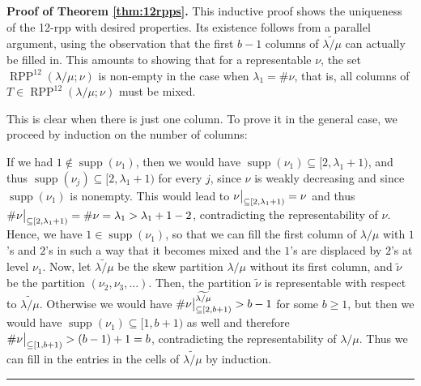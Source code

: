 \documentclass[12pt]{article}
\theoremstyle{plain}
\theoremstyle{definition}
\newenvironment{proof}[1][Proof]{\noindent\textbf{#1.} }{\ \rule{0.5em}{0.5em}}
\def\seplistvar{{{\nu}}} %
\def\supp{{\operatorname{supp}}}
\def\lm{{\lambda/\mu}}
\def\OneTwoRPPCutvar{{\operatorname{RPP}^{12}\left(  \lambda/\mu ;\seplistvar \right)}}
\begin{document}
\begin{proof}[Proof of Theorem \ref{thm:12rpps}]
This inductive proof shows the uniqueness of the 12-rpp with desired properties. Its existence follows from a parallel argument, using the observation that the first $b-1$ columns of $\widetilde{\lm}$ can actually be filled in. This amounts to showing that for a representable $\seplistvar$, the set $\OneTwoRPPCutvar$ is non-empty in the case when $\lambda_1 = \#\seplistvar$, that is, all columns of $T \in \OneTwoRPPCutvar$ must be mixed.

This is clear when there is just one column. To prove it in the general case, we proceed by induction on the number of columns:

If we had $1 \notin \supp(\seplistvar_1)$, then we would have $\supp(\seplistvar_1) \subseteq [2, \lambda_1+1)$, and thus $\supp(\seplistvar_j) \subseteq [2, \lambda_1+1)$ for every $j$, since $\seplistvar$ is weakly decreasing and since $\supp(\seplistvar_1)$ is nonempty. This would lead to $\nuxy{2}{\lambda_1+1} = \seplistvar$ and thus $\#\nuxy{2}{\lambda_1+1} = \#\seplistvar = \lambda_1 > \lambda_1 + 1 - 2$, contradicting the representability of $\seplistvar$. Hence, we have $1 \in \supp(\seplistvar_1)$, so that we can fill the first column of $\lm$ with $1$'s and $2$'s in such a way that it becomes mixed and the $1$'s are displaced by $2$'s at level $\seplistvar_1$. Now, let $\widetilde{\lm}$ be the skew partition $\lm$ without its first column, and $\widetilde{\seplistvar}$ be the partition $\left(\seplistvar_2, \seplistvar_3, \ldots\right)$. Then, the partition $\widetilde{\seplistvar}$ is representable with respect to $\widetilde{\lm}$. Otherwise we would have $\#\nuxy{2}{b+1}^{\widetilde{\lm}}>b-1$ for some $b \geq 1$, but then we would have $\supp(\seplistvar_1) \subseteq [1,b+1)$ as well and therefore $\#\nuxy{1}{b+1}>(b-1)+1=b$, contradicting the representability of $\lm$. Thus we can fill in the entries in the cells of $\widetilde{\lm}$ by induction.
\end{proof}
\end{document}
